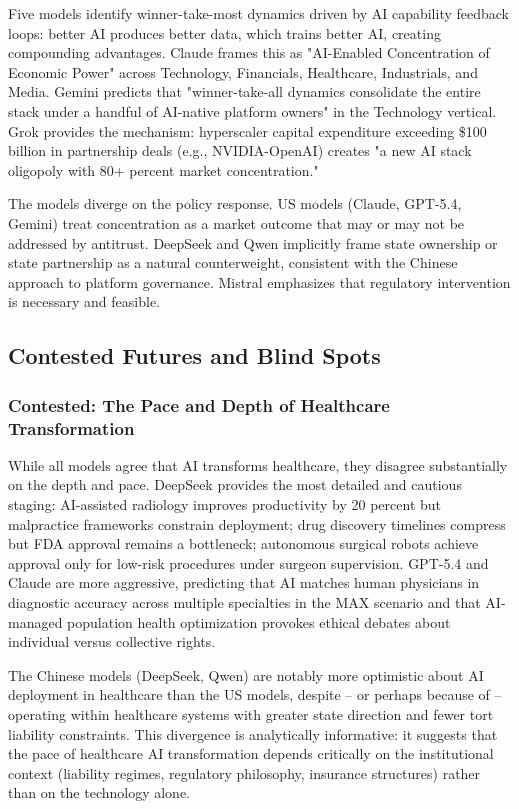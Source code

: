 \documentclass[preprint,review,12pt]{elsarticle}
\begin{document}
Five models identify winner-take-most dynamics driven by AI capability feedback loops: better AI produces better data, which trains better AI, creating compounding advantages. Claude frames this as "AI-Enabled Concentration of Economic Power" across Technology, Financials, Healthcare, Industrials, and Media. Gemini predicts that "winner-take-all dynamics consolidate the entire stack under a handful of AI-native platform owners" in the Technology vertical. Grok provides the mechanism: hyperscaler capital expenditure exceeding \$100 billion in partnership deals (e.g., NVIDIA-OpenAI) creates "a new AI stack oligopoly with 80+ percent market concentration."

The models diverge on the policy response. US models (Claude, GPT-5.4, Gemini) treat concentration as a market outcome that may or may not be addressed by antitrust. DeepSeek and Qwen implicitly frame state ownership or state partnership as a natural counterweight, consistent with the Chinese approach to platform governance. Mistral emphasizes that regulatory intervention is necessary and feasible.


\subsection{Contested Futures and Blind Spots}
\label{sec:contested_futures}


\subsubsection{Contested: The Pace and Depth of Healthcare Transformation}
\label{sec:healthcare_contested}

While all models agree that AI transforms healthcare, they disagree substantially on the depth and pace. DeepSeek provides the most detailed and cautious staging: AI-assisted radiology improves productivity by 20 percent but malpractice frameworks constrain deployment; drug discovery timelines compress but FDA approval remains a bottleneck; autonomous surgical robots achieve approval only for low-risk procedures under surgeon supervision. GPT-5.4 and Claude are more aggressive, predicting that AI matches human physicians in diagnostic accuracy across multiple specialties in the MAX scenario and that AI-managed population health optimization provokes ethical debates about individual versus collective rights.

The Chinese models (DeepSeek, Qwen) are notably more optimistic about AI deployment in healthcare than the US models, despite -- or perhaps because of -- operating within healthcare systems with greater state direction and fewer tort liability constraints. This divergence is analytically informative: it suggests that the pace of healthcare AI transformation depends critically on the institutional context (liability regimes, regulatory philosophy, insurance structures) rather than on the technology alone.
\end{document}
